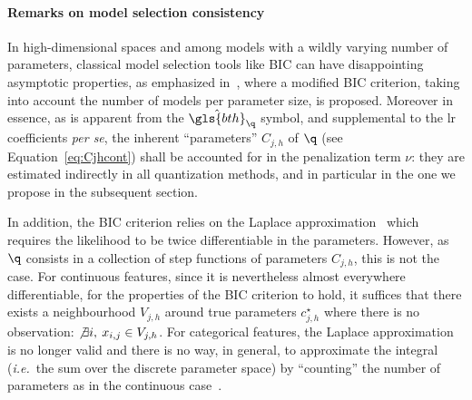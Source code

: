 \paragraph{Remarks on model selection consistency} \label{par:consistency}

In high-dimensional spaces and among models with a wildly varying number of parameters, classical model selection tools like BIC can have disappointing asymptotic properties, as emphasized in~\cite{chen2008extended}, where a modified BIC criterion, taking into account the number of models per parameter size, is proposed.
Moreover in essence, as is apparent from the $\hat{\gls{bth}}_{\q}$ symbol, and supplemental to the \gls{lr} coefficients \textit{per se}, the inherent ``parameters'' $C_{j,h}$ of $\q$ (see Equation~\eqref{eq:Cjhcont}) shall be accounted for in the penalization term $\nu$: they are estimated indirectly in all quantization methods, and in particular in the one we propose in the subsequent section.

In addition, the BIC criterion relies on the Laplace approximation~\cite{lebarbier} which requires the likelihood to be twice differentiable in the parameters. However, as $\q$ consists in a collection of step functions of parameters $C_{j,h}$, this is not the case. For continuous features, since it is nevertheless almost everywhere differentiable, for the properties of the BIC criterion to hold, it suffices that there exists a neighbourhood $V_{j,h}$ around true parameters $c_{j,h}^\star$ where there is no observation: $\not\exists i, \: x_{i,j} \in V_{j,h}$. For categorical features, the Laplace approximation~\cite{lebarbier} is no longer valid and there is no way, in general, to approximate the integral (\textit{i.e.}\ the sum over the discrete parameter space) by ``counting'' the number of parameters as in the continuous case~\cite{vincent_disc}.


